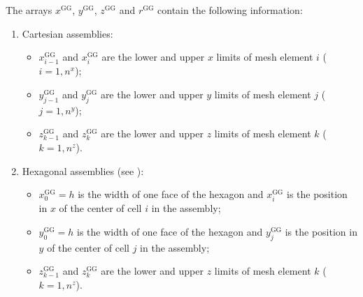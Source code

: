 The arrays $x^{\text{GG}}$, $y^{\text{GG}}$, $z^{\text{GG}}$ and $r^{\text{GG}}$ contain the following information:
\begin{enumerate}
\item Cartesian assemblies: 
  \begin{itemize}
  \item $x^{\text{GG}}_{i-1}$ and $x^{\text{GG}}_{i}$ are the lower and upper $x$ limits of mesh element $i$ ($i=1,n^{x}$);
  \item $y^{\text{GG}}_{j-1}$ and $y^{\text{GG}}_{j}$ are the lower and upper $y$ limits of mesh element $j$ ($j=1,n^{y}$);
  \item $z^{\text{GG}}_{k-1}$ and $z^{\text{GG}}_{k}$ are the lower and upper $z$ limits of mesh element $k$ ($k=1,n^{z}$).
  \end{itemize}
\item Hexagonal assemblies (see ): 
  \begin{itemize}
  \item $x^{\text{GG}}_{0}=h$ is the width of one face of the hexagon and $x^{\text{GG}}_{i}$ is the position in $x$ of the center of cell $i$ in the assembly;
  \item $y^{\text{GG}}_{0}=h$ is the width of one face of the hexagon and $y^{\text{GG}}_{j}$ is the position in $y$ of the center of cell $j$ in the assembly;
  \item $z^{\text{GG}}_{k-1}$ and $z^{\text{GG}}_{k}$ are the lower and upper $z$ limits of mesh element $k$ ($k=1,n^{z}$).
  \end{itemize}
\end{enumerate}

